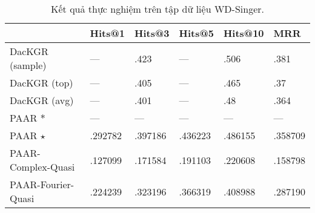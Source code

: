 \begin{center}
    \begin{table}[H]
        \centering
        \caption{Kết quả thực nghiệm trên tập dữ liệu WD-Singer.}
        \begin{tabular}{llllll}
            \toprule
         & Hits@1 & Hits@3 & Hits@5 & Hits@10 & MRR \\
            \midrule
         DacKGR (sample) & --- &  .423 & --- &  .506 &  .381\\
         DacKGR (top) & --- &  .405 &---  &  .465 & .37 \\
         DacKGR (avg) & --- & .401 & --- &  .48 & .364 \\
         PAAR $\ast$& --- & --- & --- & --- &  ---\\
         PAAR $\star$& .292782 & .397186 &.436223 &.486155&.358709\\
         PAAR-Complex-Quasi &.127099 &.171584&.191103&.220608&.158798\\
         PAAR-Fourier-Quasi & .224239 & .323196 & .366319 & .408988 & .287190  \\
         \bottomrule
        \end{tabular}
    \end{table}
\end{center}